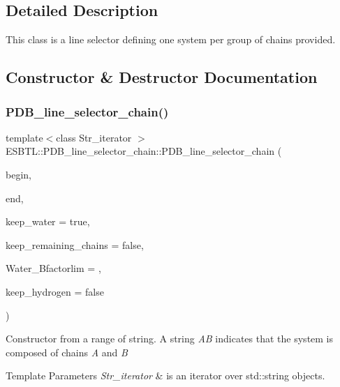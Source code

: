 \subsection{Detailed Description}
This class is a line selector defining one system per group of chains provided. 

\subsection{Constructor \& Destructor Documentation}
\mbox{\label{classESBTL_1_1PDB__line__selector__chain_a3ab3696d31d1850c53baa12e82f121fd}} 
\subsubsection{\texorpdfstring{P\+D\+B\+\_\+line\+\_\+selector\+\_\+chain()}{PDB\_line\_selector\_chain()}}
{\footnotesize\ttfamily template$<$class Str\+\_\+iterator $>$ \\
E\+S\+B\+T\+L\+::\+P\+D\+B\+\_\+line\+\_\+selector\+\_\+chain\+::\+P\+D\+B\+\_\+line\+\_\+selector\+\_\+chain (\begin{DoxyParamCaption}\item[{const Str\+\_\+iterator \&}]{begin,  }\item[{const Str\+\_\+iterator \&}]{end,  }\item[{bool}]{keep\+\_\+water = {\ttfamily true},  }\item[{bool}]{keep\+\_\+remaining\+\_\+chains = {\ttfamily false},  }\item[{double}]{Water\+\_\+\+Bfactorlim = {},  }\item[{bool}]{keep\+\_\+hydrogen = {\ttfamily false} }\end{DoxyParamCaption})\hspace{0.3cm}{\ttfamily [inline]}}

Constructor from a range of string. A string {\itshape AB} indicates that the system is composed of chains {\itshape A} and {\itshape B} 
\begin{DoxyTemplParams}{Template Parameters}
{\em Str\+\_\+iterator} & is an iterator over std\+::string objects. \\
\hline
\end{DoxyTemplParams}

